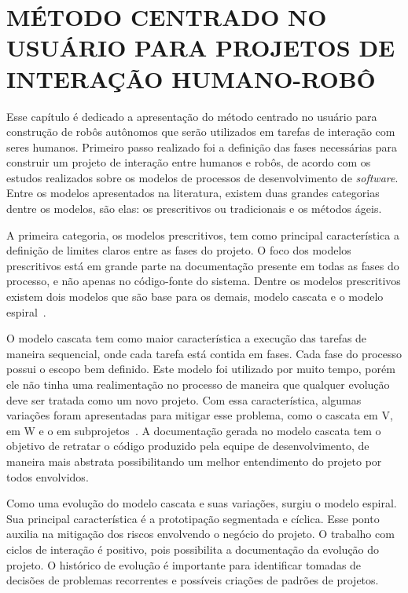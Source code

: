 \chapter{MÉTODO CENTRADO NO USUÁRIO PARA PROJETOS DE INTERAÇÃO HUMANO-ROBÔ}
\label{cap:projetoihr}
Esse capítulo é dedicado a apresentação do método centrado no usuário para construção de robôs autônomos  que serão utilizados em tarefas de interação com seres humanos. Primeiro passo realizado foi a definição das fases necessárias para construir um projeto de interação entre humanos e robôs, de acordo com os estudos realizados sobre os modelos de processos de desenvolvimento de \emph{software}. Entre os modelos apresentados na literatura, existem duas grandes categorias dentre os modelos, são elas: os prescritivos ou tradicionais e os métodos ágeis.

A primeira categoria, os modelos prescritivos, tem como principal característica a definição de limites claros entre as fases do projeto. O foco dos modelos prescritivos está em grande parte na documentação presente em todas as fases do processo, e não apenas no código-fonte do sistema. Dentre os modelos prescritivos existem dois modelos que são base para os demais, modelo cascata e o modelo espiral~\cite{sommerville:2008, wazlawick:2013}.

O modelo cascata tem como maior característica a execução das tarefas de maneira sequencial, onde cada tarefa está contida em fases. Cada fase do processo possui o escopo bem definido. Este modelo foi utilizado por muito tempo, porém ele não tinha uma realimentação no processo de maneira que qualquer evolução deve ser tratada como um novo projeto. Com essa característica, algumas variações foram apresentadas para mitigar esse problema, como o cascata em V, em W e o em subprojetos~\cite{wazlawick:2013}. A documentação gerada no modelo cascata tem o objetivo de retratar o código produzido pela equipe de desenvolvimento, de maneira mais abstrata possibilitando um melhor entendimento do projeto por todos envolvidos.

Como uma evolução do modelo cascata e suas variações, surgiu o modelo espiral. Sua principal característica é a prototipação segmentada e cíclica. Esse ponto auxilia na mitigação dos riscos envolvendo o negócio do projeto. O trabalho com ciclos de interação é positivo, pois possibilita a documentação da evolução do projeto. O histórico de evolução é importante para identificar tomadas de decisões de problemas recorrentes e possíveis criações de padrões de projetos.


